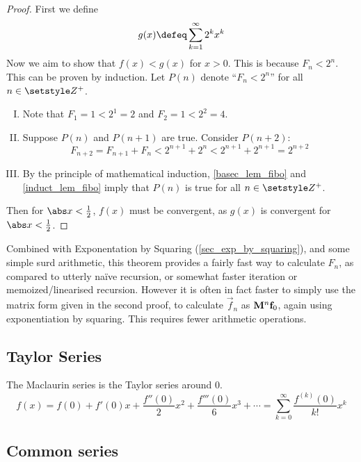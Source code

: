 \begin{proof}
 First we define
 \begin{equation*}
  g(x) \defeq \sum_{k=1}^\infty 2^k x^k
 \end{equation*}
 Now we aim to show that \(f(x) < g(x)\) for \(x > 0\). This is because
 \(F_n < 2^n\). This can be proven by induction. Let \(P(n)\) denote
 ``\(F_n < 2^n\)'' for all \(n \in \Integers^+\).
 \begin{enumerate}[I.]
  \item \label{basec_lem_fibo}
        Note that \(F_1 = 1 < 2^1 = 2\) and \(F_2 = 1 < 2^2 = 4\).
  \item \label{induct_lem_fibo}
        Suppose \(P(n)\) and \(P(n + 1)\) are true. Consider \(P(n + 2)\):
        \begin{equation*}
        F_{n + 2} = F_{n + 1} + F_n < 2^{n + 1} + 2^n < 2^{n + 1} + 2^{n + 1}
            = 2^{n + 2}
        \end{equation*}
  \item By the principle of mathematical induction, \ref{basec_lem_fibo} and
        \ref{induct_lem_fibo} imply that \(P(n)\) is true for all
        \(n \in \Integers^+\).
 \end{enumerate}
 Then for \(\abs x < \frac 12\), \(f(x)\)  must be convergent, as \(g(x)\) is
 convergent for \(\abs x < \frac 12\).
\end{proof}
Combined with Exponentation by Squaring (\ref{sec_exp_by_squaring}), and some
simple surd arithmetic, this theorem provides a fairly fast way to calculate
\(F_n\), as compared to utterly na\"ive recursion, or somewhat faster iteration
or memoized/linearised recursion. However it is often in fact faster to
simply use the matrix form given in the second proof, to calculate
\(\vec f_n\) as \(\mathbf{M}^n\mathrm{\mathbf{f}}_0\), again using exponentiation by squaring.
This requires fewer arithmetic operations.

\subsection{Taylor Series}

The Maclaurin series is the Taylor series around \(0\).
\begin{equation*}
f(x) = f(0) + f'(0) x + \frac{f''(0)} 2 x^2 + \frac{f'''(0)}6 x^3 +\dotsb
  = \sum_{k=0}^\infty \frac{f^{(k)}(0)}{k!}x^k
\end{equation*}

\subsection{Common series}
